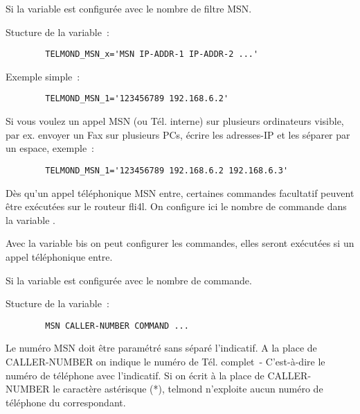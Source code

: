 \begin{description}
  Si la variable  est configurée avec le nombre de filtre MSN.

  Stucture de la variable~:
\begin{example}
\begin{verbatim}
        TELMOND_MSN_x='MSN IP-ADDR-1 IP-ADDR-2 ...'
\end{verbatim}
\end{example}

  Exemple simple~:

\begin{example}
\begin{verbatim}
        TELMOND_MSN_1='123456789 192.168.6.2'
\end{verbatim}
\end{example}

  Si vous voulez un appel MSN (ou Tél. interne) sur plusieurs ordinateurs visible,
  par ex. envoyer un Fax sur plusieurs PCs, écrire les adresses-IP et les séparer
  par un espace, exemple~:

\begin{example}
\begin{verbatim}
        TELMOND_MSN_1='123456789 192.168.6.2 192.168.6.3'
\end{verbatim}
\end{example}


  Dès qu'un appel téléphonique MSN entre, certaines commandes facultatif peuvent
  être exécutées sur le routeur fli4l. On configure ici le nombre de commande dans
  la variable .


  Avec la variable  bis  on peut
  configurer les commandes, elles seront exécutées si un appel téléphonique entre.

  Si la variable  est configurée avec le nombre de commande.

  Stucture de la variable~:

\begin{example}
\begin{verbatim}
        MSN CALLER-NUMBER COMMAND ...
\end{verbatim}
\end{example}

  Le numéro MSN doit être paramétré sans séparé l'indicatif. A la place de
  CALLER-NUMBER on indique le numéro de Tél. complet~- C'est-à-dire le numéro de
  téléphone avec l'indicatif. Si on écrit à la place de CALLER-NUMBER le caractère
  astérisque (*), telmond n'exploite aucun numéro de téléphone du correspondant.


\end{description}
